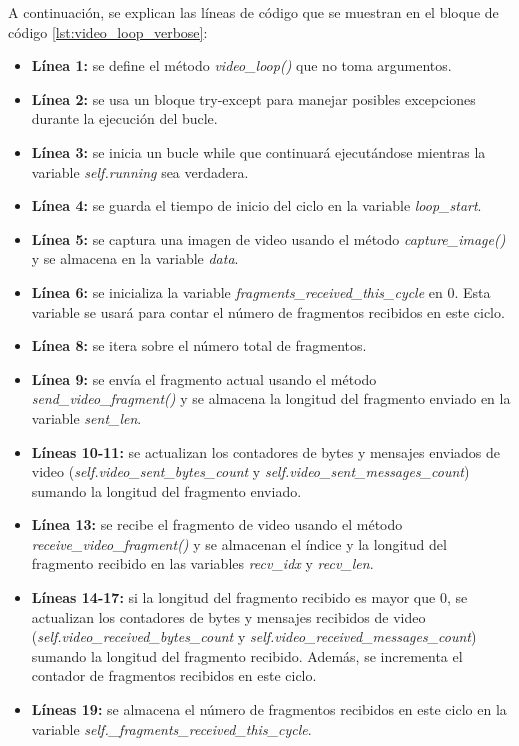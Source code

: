 A continuación, se explican las líneas de código que se muestran en el bloque de código \ref{lst:video_loop_verbose}:
\begin{itemize}
    \item \textbf{Línea 1:} se define el método \textit{video\_loop()} que no toma argumentos.
    \item \textbf{Línea 2:} se usa un bloque try-except para manejar posibles excepciones durante la ejecución del bucle.
    \item \textbf{Línea 3:} se inicia un bucle while que continuará ejecutándose mientras la variable \textit{self.running} sea verdadera.
    \item \textbf{Línea 4:} se guarda el tiempo de inicio del ciclo en la variable \textit{loop\_start}.
    \item \textbf{Línea 5:} se captura una imagen de video usando el método \textit{capture\_image()} y se almacena en la variable \textit{data}.
    \item \textbf{Línea 6:} se inicializa la variable \textit{fragments\_received\_this\_cycle} en 0. Esta variable se usará para contar el número de fragmentos recibidos en este ciclo.
    \item \textbf{Línea 8:} se itera sobre el número total de fragmentos.
    \item \textbf{Línea 9:} se envía el fragmento actual usando el método \textit{send\_video\_fragment()} y se almacena la longitud del fragmento enviado en la variable \textit{sent\_len}.
    \item \textbf{Líneas 10-11:} se actualizan los contadores de bytes y mensajes enviados de video (\textit{self.video\_sent\_bytes\_count} y \textit{self.video\_sent\_messages\_count}) sumando la longitud del fragmento enviado.
    \item \textbf{Línea 13:} se recibe el fragmento de video usando el método \textit{receive\_video\_fragment()} y se almacenan el índice y la longitud del fragmento recibido en las variables \textit{recv\_idx} y \textit{recv\_len}.
    \item \textbf{Líneas 14-17:} si la longitud del fragmento recibido es mayor que 0, se actualizan los contadores de bytes y mensajes recibidos de video (\textit{self.video\_received\_bytes\_count} y \textit{self.video\_received\_messages\_count}) sumando la longitud del fragmento recibido. Además, se incrementa el contador de fragmentos recibidos en este ciclo.
    \item \textbf{Líneas 19:} se almacena el número de fragmentos recibidos en este ciclo en la variable \textit{self.\_fragments\_received\_this\_cycle}.

\end{itemize}
